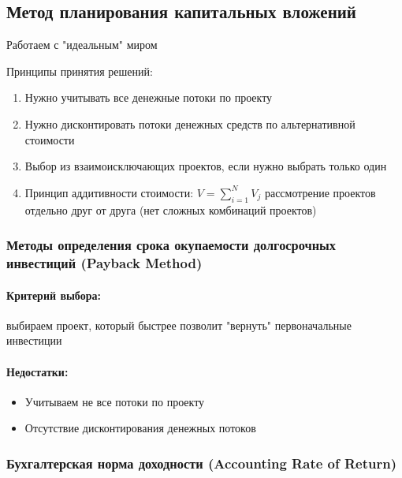 \documentclass[a4paper,12pt]{article} %
\begin{document}
   
   \subsection{Метод планирования капитальных вложений} 
   
   Работаем с "идеальным" миром 
   
   Принципы принятия решений:
   
   \begin{enumerate}
   	\item  Нужно учитывать все денежные потоки по проекту 
   	\item  Нужно дисконтировать потоки денежных средств по альтернативной  стоимости
   	\item  Выбор из взаимоисключающих проектов, если нужно выбрать только один 
   	\item Принцип аддитивности стоимости: $ V = \sum_{i=1}^{N} V_j  $ рассмотрение проектов отдельно друг от друга (нет сложных комбинаций проектов) 
   	
   \end{enumerate}
   
    
    \subsubsection{Методы определения срока окупаемости долгосрочных инвестиций (Payback Method)} 
       
   \paragraph{ Критерий выбора:     }
  выбираем проект, который быстрее позволит "вернуть" первоначальные инвестиции
  
\paragraph{    Недостатки:  }
   
   \begin{itemize}
   	\item  Учитываем не все потоки по проекту 
   	\item   Отсутствие дисконтирования денежных потоков
   \end{itemize}
   
 \subsubsection{Бухгалтерская норма доходности (Accounting Rate of Return)} 
\end{document}
